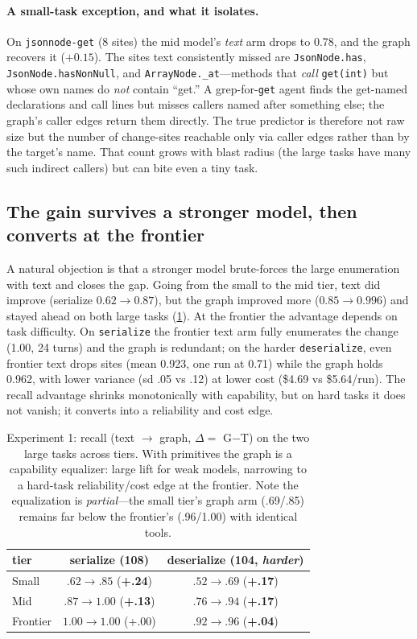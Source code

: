 \documentclass[11pt]{article}
\newcommand{\code}[1]{\texttt{#1}}
\begin{document}
\paragraph{A small-task exception, and what it isolates.}
On \code{jsonnode-get} (8 sites) the mid model's \emph{text} arm drops to 0.78,
and the graph recovers it ($+0.15$). The sites text consistently missed are
\code{JsonNode.has}, \code{JsonNode.hasNonNull}, and \code{ArrayNode.\_at}---methods
that \emph{call} \code{get(int)} but whose own names do \emph{not} contain
``get.'' A grep-for-\code{get} agent finds the get-named declarations and call
lines but misses callers named after something else; the graph's caller
edges return them directly. The true predictor is therefore not raw size but
the number of change-sites reachable only via caller edges rather than by the
target's name. That count grows with blast radius (the large tasks have many
such indirect callers) but can bite even a tiny task.

\subsection{The gain survives a stronger model, then converts at the frontier}
\label{sec:tiers}
A natural objection is that a stronger model brute-forces the large enumeration
with text and closes the gap. Going from the small to the mid tier, text did
improve (serialize $0.62\rightarrow0.87$), but the graph improved more
($0.85\rightarrow0.996$) and stayed ahead on both large tasks
(\cref{tab:tiers}). At the frontier the advantage depends on task
difficulty. On \code{serialize} the frontier text arm fully enumerates the change
(1.00, 24 turns) and the graph is redundant; on the harder \code{deserialize},
even frontier text drops sites (mean 0.923, one run at 0.71) while the
graph holds 0.962, with lower variance (sd .05 vs .12) at lower cost
(\$4.69 vs \$5.64/run). The recall advantage shrinks monotonically with
capability, but on hard tasks it does not vanish; it converts into a
reliability and cost edge.

\begin{table}[ht]
\centering
\small
\begin{tabular}{lcc}
\toprule
tier & serialize (108) & deserialize (104, \emph{harder}) \\
\midrule
Small    & $.62 \to .85$ (\textbf{+.24}) & $.52 \to .69$ (\textbf{+.17}) \\
Mid      & $.87 \to 1.00$ (\textbf{+.13}) & $.76 \to .94$ (\textbf{+.17}) \\
Frontier & $1.00 \to 1.00$ (+.00)         & $.92 \to \mathbf{.96}$ (\textbf{+.04}) \\
\bottomrule
\end{tabular}
\caption{Experiment 1: recall (text $\to$ graph, $\Delta=$ G$-$T) on the two
large tasks across tiers. With primitives the graph is a capability equalizer:
large lift for weak models, narrowing to a hard-task reliability/cost edge at the
frontier. Note the equalization is \emph{partial}---the small tier's graph arm
(.69/.85) remains far below the frontier's (.96/1.00) with identical tools.}
\label{tab:tiers}
\end{table}
\end{document}
